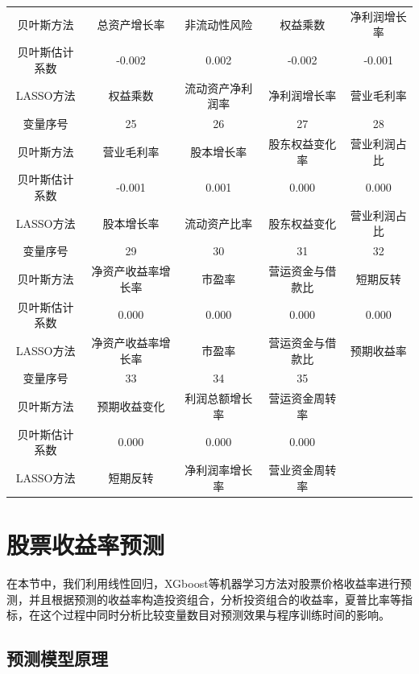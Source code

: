 \documentclass[12pt]{article} %
\begin{document}
\begin{table}[]
\begin{tabular}{ccccc}
			贝叶斯方法   & 总资产增长率    & 非流动性风险   & 权益乘数     & 净利润增长率   \\
			贝叶斯估计系数 & -0.002    & 0.002    & -0.002   & -0.001   \\
			LASSO方法 & 权益乘数      & 流动资产净利润率 & 净利润增长率   & 营业毛利率    \\ \hline
			变量序号    & 25        & 26       & 27       & 28       \\ \hline
			贝叶斯方法   & 营业毛利率     & 股本增长率    & 股东权益变化率  & 营业利润占比   \\
			贝叶斯估计系数 & -0.001    & 0.001    & 0.000    & 0.000    \\
			LASSO方法 & 股本增长率     & 流动资产比率   & 股东权益变化   & 营业利润占比   \\ \hline
			变量序号    & 29        & 30       & 31       & 32       \\ \hline
			贝叶斯方法   & 净资产收益率增长率 & 市盈率      & 营运资金与借款比 & 短期反转     \\
			贝叶斯估计系数 & 0.000     & 0.000    & 0.000    & 0.000    \\
			LASSO方法 & 净资产收益率增长率 & 市盈率      & 营运资金与借款比 & 预期收益率    \\ \hline
			变量序号    & 33        & 34       & 35       &          \\ \hline
			贝叶斯方法   & 预期收益变化    & 利润总额增长率  & 营运资金周转率  &          \\
			贝叶斯估计系数 & 0.000     & 0.000    & 0.000    &          \\
			LASSO方法 & 短期反转      & 净利润率增长率  & 营业资金周转率  &          \\ \hline
		\end{tabular}
	\end{table}
	\newpage
	
	\section{股票收益率预测 \label{S4}}
	在本节中，我们利用线性回归，XGboost等机器学习方法对股票价格收益率进行预测，并且根据预测的收益率构造投资组合，分析投资组合的收益率，夏普比率等指标，在这个过程中同时分析比较变量数目对预测效果与程序训练时间的影响。
	
	\subsection{预测模型原理}
	
\end{document}
